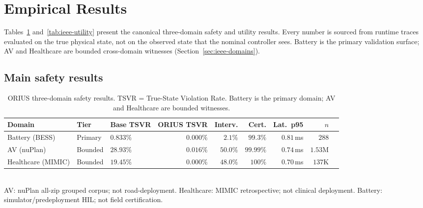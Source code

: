 
\section{Empirical Results}
\label{sec:ieee-results}

Tables~\ref{tab:ieee-main-results} and~\ref{tab:ieee-utility} present the
canonical three-domain safety and utility results.  Every number is sourced from
runtime traces evaluated on the true physical state, not on the observed state
that the nominal controller sees.  Battery is the primary validation surface;
AV and Healthcare are bounded cross-domain witnesses (Section~\ref{sec:ieee-domains}).

\subsection{Main safety results}

\begin{table}[t]
\centering
\caption{%
  ORIUS three-domain safety results.  TSVR = True-State Violation Rate.
  Battery is the primary domain; AV and Healthcare are bounded witnesses.
}
\label{tab:ieee-main-results}
\small
\begin{tabular}{@{}lllrrrrrr@{}}
\toprule
\textbf{Domain} &
\textbf{Tier} &
\textbf{Base TSVR} &
\textbf{ORIUS TSVR} &
\textbf{Interv.} &
\textbf{Cert.} &
\textbf{Lat.\ p95} &
\textbf{$n$} \\
\midrule
Battery (BESS)
  & Primary
  & $0.833\%$
  & $0.000\%$
  & $2.1\%$
  & $99.3\%$
  & $0.81$\,ms
  & $288$ \\
AV (nuPlan)
  & Bounded
  & $28.93\%$
  & $0.016\%$
  & $50.0\%$
  & $99.99\%$
  & $0.74$\,ms
  & $1.53\text{M}$ \\
Healthcare (MIMIC)
  & Bounded
  & $19.45\%$
  & $0.000\%$
  & $48.0\%$
  & $100\%$
  & $0.70$\,ms
  & $137\text{K}$ \\
\bottomrule
\end{tabular}\\[4pt]
{\footnotesize
  AV: nuPlan all-zip grouped corpus; not road-deployment.
  Healthcare: MIMIC retrospective; not clinical deployment.
  Battery: simulator/predeployment HIL; not field certification.
}
\end{table}

